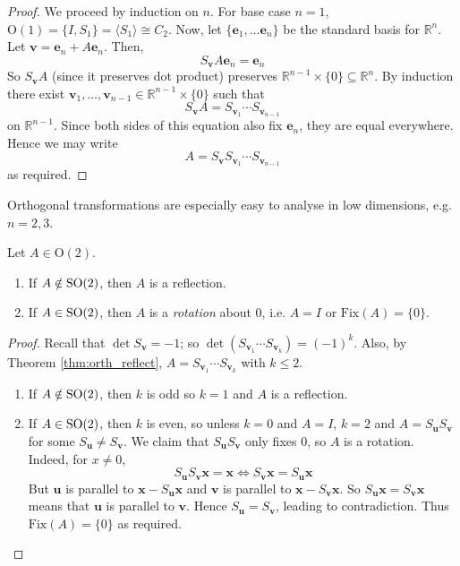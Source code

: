 \documentclass[10pt, a4paper, twoside]{report}
\begin{document}
\begin{proof}
    We proceed by induction on \(n\). For base case \(n=1\), \(\mathrm{O}(1)=\{I,S_1\}=\langle S_1\rangle\cong C_2\). Now, let \(\{\mathbf{e}_1,\ldots\mathbf{e}_n\}\) be the standard basis for \(\mathbb{R}^n\). Let \(\mathbf{v}=\mathbf{e}_n + A\mathbf{e}_n\). Then,
    \[S_\mathbf{v}A\mathbf{e}_n=\mathbf{e}_n\]
    So \(S_\mathbf{v}A\) (since it preserves dot product) preserves \(\mathbb{R}^{n-1}\times\{0\}\subseteq\mathbb{R}^n\). By induction there exist \(\mathbf{v}_1,\ldots,\mathbf{v}_{n-1}\in\mathbb{R}^{n-1}\times\{0\}\) such that 
    \[S_\mathbf{v}A=S_{\mathbf{v}_1}\cdots S_{\mathbf{v}_{n-1}}\]
    on \(\mathbb{R}^{n-1}\). Since both sides of this equation also fix \(\mathbf{e}_n\), they are equal everywhere. Hence we may write 
    \[A=S_\mathbf{v}S_{\mathbf{v}_1}\cdots S_{\mathbf{v}_{n-1}}\]
    as required.  
\end{proof}
Orthogonal transformations are especially easy to analyse in low dimensions, e.g. \(n=2,3\).
\begin{lemma}
    Let \(A\in\mathrm{O}(2)\). 
    \begin{enumerate}
        \item If \(A\notin\operatorname{SO}(2)\), then \(A\) is a reflection.
        \item If \(A\in\operatorname{SO}(2)\), then \(A\) is a \emph{rotation} about 0, i.e. \(A=I\) or \(\text{Fix}(A)=\{0\}\).
    \end{enumerate}
\end{lemma}
\begin{proof}
    Recall that \(\det S_\mathbf{v}=-1\); so \(\det(S_{\mathbf{v}_1}\cdots S_{\mathbf{v}_k})=(-1)^k\). Also, by Theorem \ref{thm:orth_reflect}, \(A=S_{\mathbf{v}_1}\cdots S_{\mathbf{v}_k}\) with \(k\leq 2\). 
    \begin{enumerate}
        \item If \(A\notin\operatorname{SO}(2)\), then \(k\) is odd so \(k=1\) and \(A\) is a reflection.
        \item If \(A\in\operatorname{SO}(2)\), then \(k\) is even, so unless \(k=0\) and \(A=I\), \(k=2\) and \(A=S_\mathbf{u}S_\mathbf{v}\) for some \(S_\mathbf{u}\neq S_\mathbf{v}\). We claim that \(S_\mathbf{u}S_\mathbf{v}\) only fixes \(0\), so \(A\) is a rotation. Indeed, for \(x\neq 0\), 
        \[S_\mathbf{u}S_\mathbf{v}\mathbf{x}=\mathbf{x}\Leftrightarrow S_\mathbf{v}\mathbf{x}=S_\mathbf{u}\mathbf{x}\]
        But \(\mathbf{u}\) is parallel to \(\mathbf{x}-S_\mathbf{u}\mathbf{x}\) and \(\mathbf{v}\) is parallel to \(\mathbf{x}-S_\mathbf{v}\mathbf{x}\). So \(S_\mathbf{u}\mathbf{x}=S_\mathbf{v}\mathbf{x}\) means that \(\mathbf{u}\) is parallel to \(\mathbf{v}\). Hence \(S_\mathbf{u}=S_\mathbf{v}\), leading to contradiction. Thus \(\text{Fix}(A)=\{0\}\) as required.
    \end{enumerate}
\end{proof}
\end{document}

